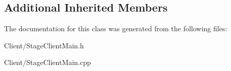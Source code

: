 \subsection*{Additional Inherited Members}


The documentation for this class was generated from the following files\-:\begin{DoxyCompactItemize}
\item 
Client/Stage\-Client\-Main.\-h\item 
Client/Stage\-Client\-Main.\-cpp\end{DoxyCompactItemize}
